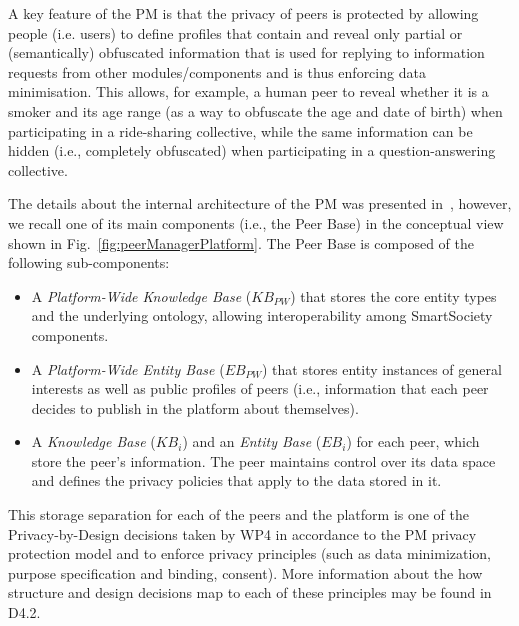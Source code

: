 A key feature of the PM is that the privacy of peers is protected by allowing people (i.e. users) to define profiles that contain and reveal only partial or (semantically) obfuscated information that is used for replying to information requests from other modules/components and is thus enforcing data minimisation. 
This allows, for example, a human peer to reveal whether it is a smoker and its age range (as a way to obfuscate the age and date of birth) when participating in a ride-sharing collective, while the same information can be hidden (i.e., completely obfuscated) when participating in a question-answering collective.

The details about the internal architecture of the PM was presented in~\cite{D4.2,Hartswood:2015fe}, however, we recall one of its main components (i.e., the Peer Base) in the conceptual view shown in Fig.~\ref{fig:peerManagerPlatform}. The Peer Base is composed of the following sub-components: 
\begin{itemize}
\item A \emph{Platform-Wide Knowledge Base} (${KB}_{PW}$) that stores the core entity types and the underlying ontology, allowing interoperability among SmartSociety components. 
\item A \emph{Platform-Wide Entity Base} (${EB}_{PW}$) that stores entity instances of general interests as well as public profiles of peers (i.e., information that each peer decides to publish in the platform about themselves).
\item A \emph{Knowledge Base} (${KB}_i$) and an \emph{Entity Base} (${EB}_i$) for each peer, which store the peer’s information. The peer maintains control over its data space and defines the privacy policies that apply to the data stored in it. 
\end{itemize}
This storage separation for each of the peers and the platform is one of the Privacy-by-Design decisions taken by WP4 in accordance to the PM  privacy protection model and to enforce privacy principles (such as data minimization, purpose specification and binding, consent). More information about the how structure and design decisions map to each of these principles may be found in D4.2.

